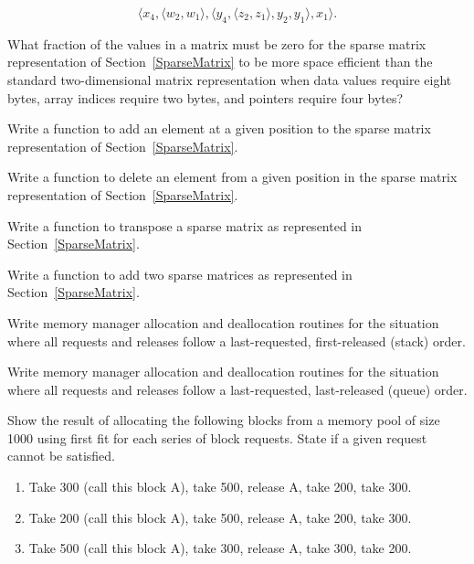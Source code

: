\begin{exercises}
\vspace{-\bigskipamount}
\[\langle x_4, \langle w_2, w_1\rangle , \langle y_4,
\langle z_2, z_1\rangle, y_2, y_1\rangle, x_1\rangle.\]

\vspace{-\medskipamount}

\item
What fraction of the values in a matrix must be zero for
the
sparse matrix representation of Section~\ref{SparseMatrix} to be more
space efficient than the standard two-dimensional matrix
representation when data values require eight bytes, array indices
require two bytes, and pointers require four bytes?

\item
Write a function to add an element at a given position to
the
sparse matrix representation of Section~\ref{SparseMatrix}.

\item
Write a function to delete an element from a given position in
the
sparse matrix representation of Section~\ref{SparseMatrix}.

\item
Write a function to transpose a
sparse matrix as represented in Section~\ref{SparseMatrix}.

\item
Write a function to add two
sparse matrices as represented in Section~\ref{SparseMatrix}.

\item
Write memory manager allocation and deallocation routines for
the situation where all requests and releases follow a last-requested,
first-released (stack) order.

\item
Write memory manager allocation and deallocation routines for
the situation where all requests and releases follow a last-requested,
last-released (queue) order.

\item
Show the result of allocating the following blocks from a memory pool
of size 1000 using first fit for each series of block requests.
State if a given request cannot be satisfied.
\begin{enumerate}
\item
Take 300 (call this block A), take 500, release A, take 200, take 300.
\item
Take 200 (call this block A), take 500, release A, take 200, take 300.
\item
Take 500 (call this block A), take 300, release A, take 300, take 200.
\end{enumerate}


\end{exercises}
